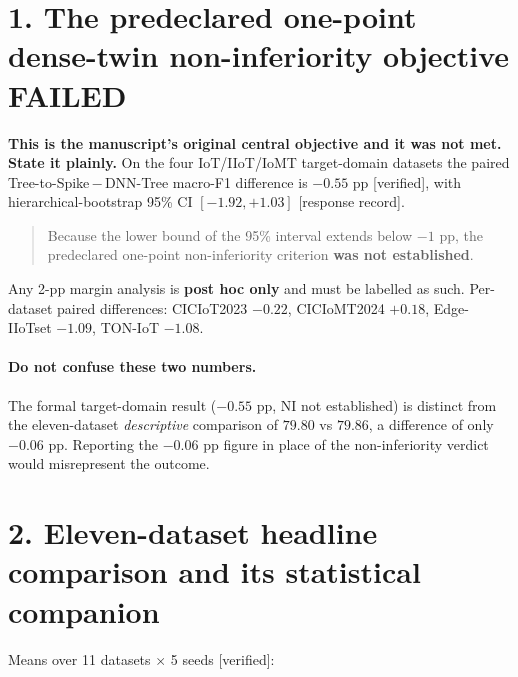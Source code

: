 \section*{1. The predeclared one-point dense-twin non-inferiority objective FAILED}

\textbf{This is the manuscript's original central objective and it was not met. State it
plainly.} On the four IoT/IIoT/IoMT target-domain datasets the paired
Tree-to-Spike\,$-$\,DNN-Tree macro-F1 difference is $\mathbf{-0.55}$ pp
\textup{[verified]}, with hierarchical-bootstrap 95\% CI $\mathbf{[-1.92, +1.03]}$
\textup{[response record]}.

\begin{quote}
Because the lower bound of the 95\% interval extends below $-1$ pp, the predeclared
one-point non-inferiority criterion \textbf{was not established}.
\end{quote}

\noindent Any 2-pp margin analysis is \textbf{post hoc only} and must be labelled as such.
Per-dataset paired differences: CICIoT2023 $-0.22$, CICIoMT2024 $+0.18$, Edge-IIoTset
$-1.09$, TON-IoT $-1.08$.

\paragraph{$\!$Do not confuse these two numbers.} The formal target-domain result
($-0.55$ pp, NI not established) is distinct from the eleven-dataset \emph{descriptive}
comparison of $79.80$ vs $79.86$, a difference of only $\mathbf{-0.06}$ pp. Reporting the
$-0.06$ pp figure in place of the non-inferiority verdict would misrepresent the outcome.

\section*{2. Eleven-dataset headline comparison and its statistical companion}

Means over 11 datasets $\times$ 5 seeds \textup{[verified]}:

